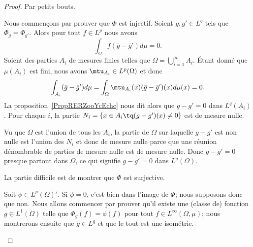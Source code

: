 \begin{proof}
	Par petits bouts.
	\begin{subproof}
		Nous commençons par prouver que \( \Phi\) est injectif. Soient \( g,g'\in L^q\) tels que \( \Phi_g=\Phi_{g'}\). Alors pour tout \( f\in L^p\) nous avons
		\begin{equation}
			\int_{\Omega}f(\bar g-\bar g')d\mu=0.
		\end{equation}
		Soient des parties \( A_i\) de mesures finies telles que \( \Omega=\bigcup_{i=1}^{\infty}A_i\). Étant donné que \( \mu(A_i)\) est fini, nous avons \( \mtu_{A_i}\in L^p(\Omega)\) et donc
		\begin{equation}
			\int_{A_i}(\bar g-\bar g')d\mu=\int_{\Omega}\mtu_{A_i}(x)(\bar g-\bar g')(x)d\mu(x)=0.
		\end{equation}
		La proposition~\ref{PropRERZooYcEchc} nous dit alors que \( g-g'=0\) dans \( L^q(A_i)\). Pour chaque \( i\), la partie \( N_i=\{ x\in A_i\tq (g-g')(x)\neq 0 \}\) est de mesure nulle.

		Vu que \( \Omega\) est l'union de tous les \( A_i\), la partie de \( \Omega\) sur laquelle \( g-g'\) est non nulle est l'union des \( N_i\) et donc de mesure nulle parce que une réunion dénombrable de parties de mesure nulle est de mesure nulle. Donc \( g-g'=0\) presque partout dans \( \Omega\), ce qui signifie \( g-g'=0\) dans \( L^q(\Omega)\).

		\spitem[La suite]

		La partie difficile est de montrer que \( \Phi\) est surjective.

		Soit \( \phi\in L^p(\Omega)'\). Si \( \phi=0\), c'est bien dans l'image de \( \Phi\); nous supposons donc que non. Nous allons commencer par prouver qu'il existe une (classe de) fonction \( g\in L^1(\Omega)\) telle que \( \Phi_g(f)=\phi(f)\) pour tout \(f\in L^{\infty}(\Omega,\mu)\); nous montrerons ensuite que \( g\in L^q\) et que le tout est une isométrie.



\end{subproof}
\end{proof}
